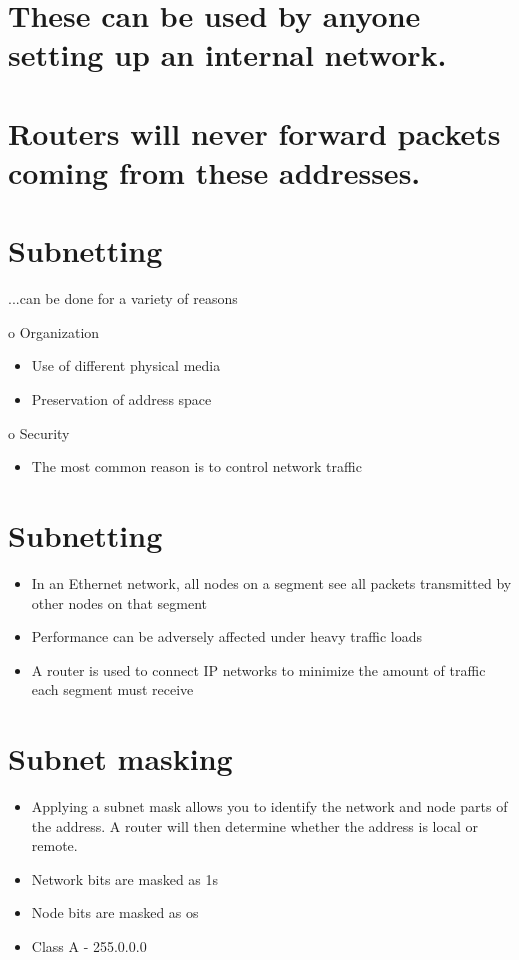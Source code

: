 \documentclass[10pt]{article}
\begin{document}
\section{These can be used by anyone setting up an internal network.}
\section{Routers will never forward packets coming from these addresses.}
\section{Subnetting}
...can be done for a variety of reasons

o Organization

\begin{itemize}
  \item Use of different physical media

  \item Preservation of address space

\end{itemize}

o Security

\begin{itemize}
  \item The most common reason is to control network traffic
\end{itemize}

\section{Subnetting}
\begin{itemize}
  \item In an Ethernet network, all nodes on a segment see all packets transmitted by other nodes on that segment

  \item Performance can be adversely affected under heavy traffic loads

  \item A router is used to connect IP networks to minimize the amount of traffic each segment must receive

\end{itemize}

\section{Subnet masking}
\begin{itemize}
  \item Applying a subnet mask allows you to identify the network and node parts of the address. A router will then determine whether the address is local or remote.

  \item Network bits are masked as 1s

  \item Node bits are masked as os

  \item Class A - 255.0.0.0

\end{itemize}
\end{document}
